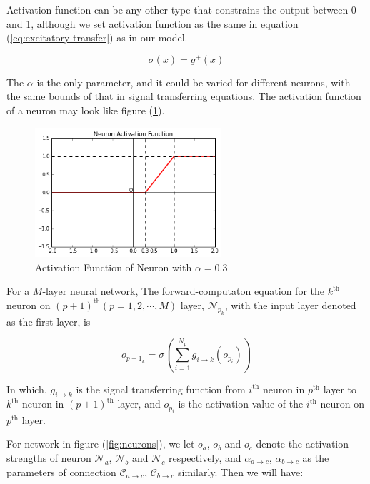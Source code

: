 \documentclass[conference]{IEEEtran}
\begin{document}
Activation function can be any other type that constrains the output between
0 and 1, although we set activation function as the same in equation
(\ref{eq:excitatory-transfer}) as in our model.

\begin{equation}
    \sigma(x)=g^{+}(x)
    \label{eq:activation}
\end{equation}

The $\alpha$ is the only parameter, and it could be varied for
different neurons, with the same bounds of that in signal
transferring equations. The activation function of a neuron may
look like figure (\ref{fig:activation}).

\begin{figure}
    \centering
    \includegraphics[height=48mm]{paper_res/activation.png}
    \caption{Activation Function of Neuron with $\alpha=0.3$}
    \label{fig:activation}
\end{figure}

For a $M$-layer neural network, The forward-computaton equation for the
$k^{\text{th}}$ neuron on $(p+1)^{\text{th}}(p=1,2,\cdots,M)$ layer,
$\mathcal{N}_{p_k}$, with the input layer denoted as the first layer, is

\begin{equation}
    o_{{p+1}_k}=\sigma(\sum_{i=1}^{N_p}g_{i\rightarrow{k}}(o_{p_i}))
    \label{eq:forward}
\end{equation}

In which, $g_{i\rightarrow{k}}$ is the signal transferring function from
$i^{\text{th}}$ neuron in $p^{\text{th}}$ layer to $k^{\text{th}}$ neuron
in $(p+1)^{\text{th}}$ layer,
and $o_{p_i}$ is the activation value of the $i^{\text{th}}$ neuron on
$p^{\text{th}}$ layer.

For network in figure (\ref{fig:neurons}), we let $o_a$, $o_b$ and $o_c$
denote the activation strengths of neuron $\mathcal{N}_a$, $\mathcal{N}_b$
and $\mathcal{N}_c$ respectively, and $\alpha_{a\rightarrow c}$,
$\alpha_{b\rightarrow c}$ as the parameters of connection
$\mathcal{C}_{a\rightarrow c}$, $\mathcal{C}_{b\rightarrow c}$ similarly.
Then we will have:
\end{document}
